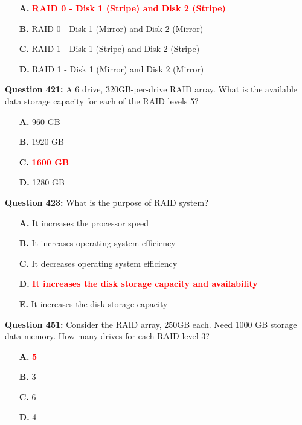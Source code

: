 \documentclass[12pt,a4paper]{article}
\begin{document}
\begin{itemize}
    \item[\textbf{A.}] \textcolor{red}{\textbf{RAID 0 - Disk 1 (Stripe) and Disk 2 (Stripe)}}
    \item[\textbf{B.}] RAID 0 - Disk 1 (Mirror) and Disk 2 (Mirror)
    \item[\textbf{C.}] RAID 1 - Disk 1 (Stripe) and Disk 2 (Stripe)
    \item[\textbf{D.}] RAID 1 - Disk 1 (Mirror) and Disk 2 (Mirror)
\end{itemize}

\vspace{0.5cm}

\textbf{Question 421:} A 6 drive, 320GB-per-drive RAID array. What is the available data storage capacity for each of the RAID levels 5?

\begin{itemize}
    \item[\textbf{A.}] 960 GB
    \item[\textbf{B.}] 1920 GB
    \item[\textbf{C.}] \textcolor{red}{\textbf{1600 GB}}
    \item[\textbf{D.}] 1280 GB
\end{itemize}

\vspace{0.5cm}

\textbf{Question 423:} What is the purpose of RAID system?

\begin{itemize}
    \item[\textbf{A.}] It increases the processor speed
    \item[\textbf{B.}] It increases operating system efficiency
    \item[\textbf{C.}] It decreases operating system efficiency
    \item[\textbf{D.}] \textcolor{red}{\textbf{It increases the disk storage capacity and availability}}
    \item[\textbf{E.}] It increases the disk storage capacity
\end{itemize}

\vspace{0.5cm}

\textbf{Question 451:} Consider the RAID array, 250GB each. Need 1000 GB storage data memory. How many drives for each RAID level 3?

\begin{itemize}
    \item[\textbf{A.}] \textcolor{red}{\textbf{5}}
    \item[\textbf{B.}] 3
    \item[\textbf{C.}] 6
    \item[\textbf{D.}] 4
\end{itemize}
\end{document}

